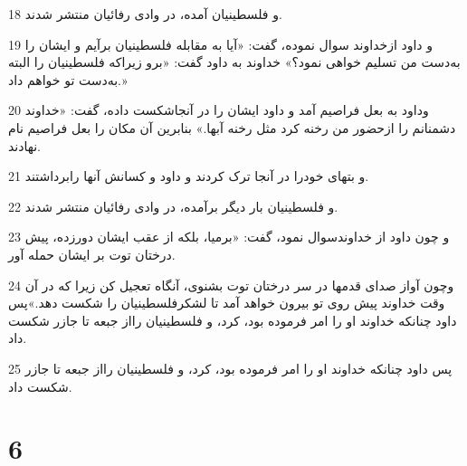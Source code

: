 \par 18 و فلسطینیان آمده، در وادی رفائیان منتشر شدند.
\par 19 و داود ازخداوند سوال نموده، گفت: «آیا به مقابله فلسطینیان برآیم و ایشان را به‌دست من تسلیم خواهی نمود؟» خداوند به داود گفت: «برو زیراکه فلسطینیان را البته به‌دست تو خواهم داد.»
\par 20 وداود به بعل فراصیم آمد و داود ایشان را در آنجاشکست داده، گفت: «خداوند دشمنانم را ازحضور من رخنه کرد مثل رخنه آبها.» بنابرین آن مکان را بعل فراصیم نام نهادند.
\par 21 و بتهای خودرا در آنجا ترک کردند و داود و کسانش آنها رابرداشتند.
\par 22 و فلسطینیان بار دیگر برآمده، در وادی رفائیان منتشر شدند.
\par 23 و چون داود از خداوندسوال نمود، گفت: «برمیا، بلکه از عقب ایشان دورزده، پیش درختان توت بر ایشان حمله آور.
\par 24 وچون آواز صدای قدمها در سر درختان توت بشنوی، آنگاه تعجیل کن زیرا که در آن وقت خداوند پیش روی تو بیرون خواهد آمد تا لشکرفلسطینیان را شکست دهد.»پس داود چنانکه خداوند او را امر فرموده بود، کرد، و فلسطینیان رااز جبعه تا جازر شکست داد.
\par 25 پس داود چنانکه خداوند او را امر فرموده بود، کرد، و فلسطینیان رااز جبعه تا جازر شکست داد.
 
\chapter{6}

